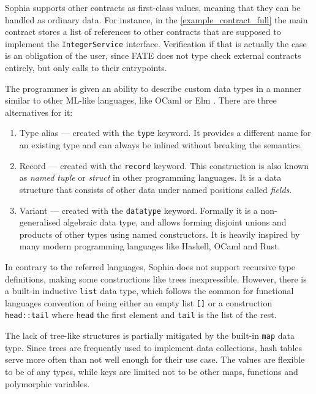 Sophia supports other contracts as first-class values, meaning that they can be
handled as ordinary data. For instance, in the \autoref{example_contract_full}
the main contract stores a list of references to other contracts that are
supposed to implement the \texttt{IntegerService} interface. Verification if
that is actually the case is an obligation of the user, since FATE does not type
check external contracts entirely, but only calls to their entrypoints.

The programmer is given an ability to describe custom data types in a manner
similar to other ML-like languages, like OCaml \cite{ocaml} or Elm
\cite{elm2013}. There are three alternatives for it:

\begin{enumerate}
\item Type alias --- created with the \texttt{type} keyword. It provides a
  different name for an existing type and can always be inlined without
  breaking the semantics.
\item Record --- created with the \texttt{record} keyword. This construction is
  also known as \emph{named tuple} or \emph{struct} in other programming
  languages. It is a data structure that consists of other data under named
  positions called \emph{fields}.
\item Variant --- created with the \texttt{datatype} keyword. Formally it is a
  non-generalised algebraic data type, and allows forming disjoint unions and
  products of other types using named constructors. It is heavily inspired by
  many modern programming languages like Haskell, OCaml and Rust.
\end{enumerate}

In contrary to the referred languages, Sophia does not support recursive type
definitions, making some constructions like trees inexpressible. However, there
is a built-in inductive \texttt{list} data type, which follows the common for
functional languages convention of being either an empty list \texttt{[]} or a
construction \texttt{head::tail} where \texttt{head} the first element and
\texttt{tail} is the list of the rest.

The lack of tree-like structures is partially mitigated by the built-in
\texttt{map} data type. Since trees are frequently used to implement data
collections, hash tables serve more often than not well enough for their use
case. The values are flexible to be of any types, while keys are limited not to
be other maps, functions and polymorphic variables.

